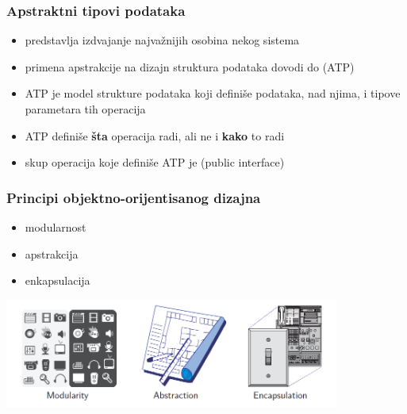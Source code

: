 \documentclass[compress,aspectratio=169]{beamer}
\begin{document}
\begin{frame}[fragile]
  \frametitle{Apstraktni tipovi podataka}
  \begin{itemize}
    \item {} predstavlja izdvajanje najvažnijih osobina nekog sistema
    \item primena apstrakcije na dizajn struktura podataka dovodi do  (ATP)
    \item ATP je model strukture podataka koji definiše  podataka,  nad njima, i tipove parametara tih operacija
    \item ATP definiše \textbf{šta} operacija radi, ali ne i \textbf{kako} to radi
    \item skup operacija koje definiše ATP je  (public interface)
  \end{itemize}
\end{frame}

\begin{frame}[fragile]
  \frametitle{Principi objektno-orijentisanog dizajna}
  \begin{itemize}
    \item modularnost
    \item apstrakcija
    \item enkapsulacija
  \end{itemize}
  \begin{center}
    \includegraphics[width=11cm]{asp-03-pic01.png}
  \end{center}
\end{frame}
\end{document}
